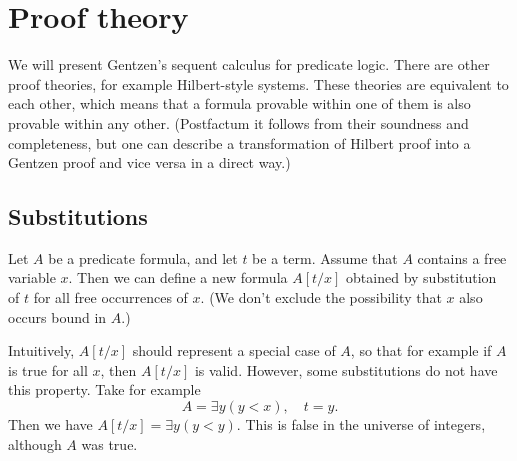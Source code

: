 \section{Proof theory}
We will present Gentzen's sequent calculus for predicate logic.
There are other proof theories, for example Hilbert-style systems.
These theories are equivalent to each other, which means that a formula provable within one of them is also provable within any other.
(Postfactum it follows from their soundness and completeness,
but one can describe a transformation of Hilbert proof into a Gentzen proof and vice versa in a direct way.)


\subsection{Substitutions}
Let $A$ be a predicate formula, and let $t$ be a term.
Assume that $A$ contains a free variable $x$.
Then we can define a new formula $A[t/x]$ obtained by substitution of $t$ for all free occurrences of $x$.
(We don't exclude the possibility that $x$ also occurs bound in $A$.)

Intuitively, $A[t/x]$ should represent a special case of $A$, so that for example if $A$ is true for all $x$, then $A[t/x]$ is valid.
However, some substitutions do not have this property.
Take for example
\[
A = \exists y (y < x), \quad t = y.
\]
Then we have $A[t/x] = \exists y (y < y)$.
This is false in the universe of integers, although $A$ was true.
